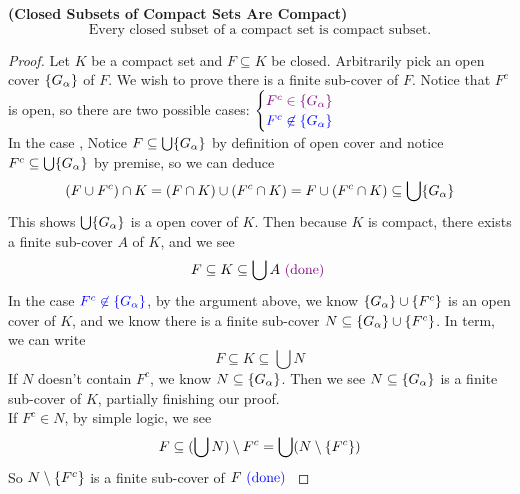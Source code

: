 \documentclass{report}
\begin{document}
\begin{theorem}
\label{2.8.3}
\textbf{(Closed Subsets of Compact Sets Are Compact)} 
\begin{equation}
\text{ Every closed subset of a compact set is compact subset. }
\end{equation}
\end{theorem}
\begin{proof}
Let $K$ be a compact set and $F\subseteq K$ be closed. Arbitrarily pick an open cover $\{ G_\alpha  \}$ of $F$. We wish to prove there is a finite sub-cover of $F$. Notice that $F^c$ is open, so there are two possible cases:  $\begin{cases}
  \textcolor{violet}{F^c\in \{ G_\alpha  \}}\\
  \textcolor{blue}{F^c\not\in \{ G_\alpha  \}}
\end{cases}$\\

In the case  , Notice  $F\subseteq \bigcup \{ G_{\alpha } \}$ by definition of open cover and notice $F^c\subseteq \bigcup \{ G_\alpha  \}$ by premise, so we can deduce
\begin{equation}
(F\cup F^c)\cap K=(F\cap K)\cup (F^c \cap K)=F \cup (F^c \cap K)\subseteq \bigcup \{ G_\alpha  \}
\end{equation}
This shows $\bigcup \{ G_\alpha  \}$ is a open cover of $K$. Then because  $K$ is compact, there exists a finite sub-cover $A$ of $K$, and we see
\begin{equation}
F\subseteq K \subseteq \bigcup A\textcolor{violet}{\text{ (done) }}
\end{equation}
In the case $\textcolor{blue}{F^c\not\in \{ G_\alpha  \}}$, by the argument above, we know $\{ G_\alpha  \} \cup \{ F^c \}$ is an open cover of $K$, and we know there is a finite sub-cover $N\subseteq\{ G_\alpha  \} \cup \{ F^c \}$. In term, we can write
\begin{equation}
F\subseteq K \subseteq \bigcup N
\end{equation}
If $N$ doesn't contain $F^c$, we know $N\subseteq \{ G_\alpha  \}$. Then we see $N\subseteq \{ G_\alpha  \}$ is a finite sub-cover of $K$, partially finishing our proof.\\

If $F^c \in N$, by simple logic, we see
\begin{equation}
F\subseteq (\bigcup N)\setminus F^c=\bigcup (N\setminus \{ F^c \}) 
\end{equation}
So $N\setminus \{ F^c \}$ is a finite sub-cover of $F\textcolor{blue}{\text{ (done) }}$
\end{proof}
\end{document}
